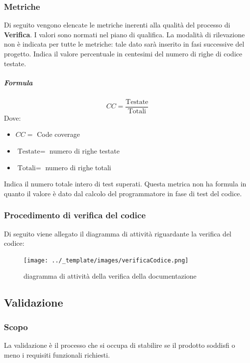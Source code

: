 	\subsubsection{Metriche}
	Di seguito vengono elencate le metriche inerenti alla qualità del processo di \textbf{Verifica}. I valori sono normati nel piano di qualifica. La modalità di rilevazione non è indicata per tutte le metriche: tale dato sarà inserito in fasi successive del progetto.
        Indica il valore percentuale in centesimi del numero di righe di codice testate.
        \subparagraph{Formula}
        \begin{displaymath}
          CC = \frac{\textrm{Testate}}{\textrm{Totali}}
        \end{displaymath}
        Dove:
        \begin{itemize}
        \item[] $CC =$ Code coverage
        \item[] $\textrm{Testate} =$ numero di righe testate
        \item[] $\textrm{Totali} =$ numero di righe totali
        \end{itemize}
        
        
        Indica il numero totale intero di test superati. Questa metrica non ha formula in quanto il valore è dato dal calcolo del programmatore in fase di test del codice.
	
	   \subsubsection{Procedimento di verifica del codice}
		Di seguito viene allegato il diagramma di attività riguardante la verifica del codice:
		\begin{figure}[hbt!]
	       \centering \texttt{[image: ../\_template/images/verificaCodice.png]}
	        \caption{diagramma di attività della verifica della documentazione}
	    \end{figure}

	\subsection{Validazione}

	\subsubsection{Scopo}
	La validazione è il processo che si occupa di stabilire se il prodotto soddisfi o meno i requisiti funzionali richiesti. 
	
